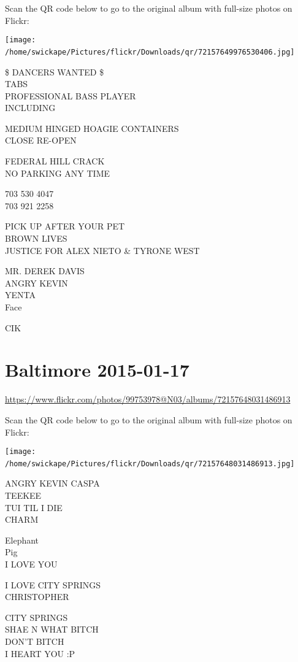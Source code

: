 \documentclass[10pt,letterpaper]{article}
\begin{document}
Scan the QR code below to go to the original album with full-size photos on Flickr:

\texttt{[image: /home/swickape/Pictures/flickr/Downloads/qr/72157649976530406.jpg]}
\

\$ DANCERS WANTED \$\\
TABS\\
PROFESSIONAL BASS PLAYER\\
INCLUDING

MEDIUM HINGED HOAGIE CONTAINERS\\
CLOSE RE{-}OPEN

FEDERAL HILL CRACK\\
NO PARKING ANY TIME

703 530 4047\\
703 921 2258

PICK UP AFTER YOUR PET\\
BROWN LIVES\\
JUSTICE FOR ALEX NIETO \& TYRONE WEST

MR. DEREK DAVIS\\
ANGRY KEVIN\\
YENTA\\
Face

CIK
\

\section*{Baltimore 2015-01-17}

\url{https://www.flickr.com/photos/99753978@N03/albums/72157648031486913}

Scan the QR code below to go to the original album with full-size photos on Flickr:

\texttt{[image: /home/swickape/Pictures/flickr/Downloads/qr/72157648031486913.jpg]}
\

ANGRY KEVIN CASPA\\
TEEKEE\\
TUI TIL I DIE\\
CHARM

Elephant\\
Pig\\
I LOVE YOU

I LOVE CITY SPRINGS\\
CHRISTOPHER

CITY SPRINGS\\
SHAE N WHAT BITCH\\
DON'T BITCH\\
I HEART YOU :P
\end{document}
